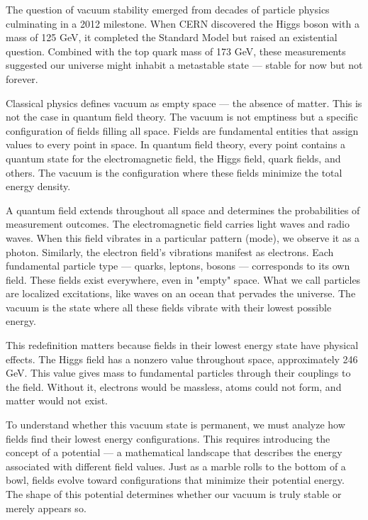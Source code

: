 
The question of vacuum stability emerged from decades of particle physics culminating in a 2012 milestone. When CERN discovered the Higgs boson with a mass of 125 GeV, it completed the Standard Model but raised an existential question. Combined with the top quark mass of 173 GeV, these measurements suggested our universe might inhabit a metastable state — stable for now but not forever.

Classical physics defines vacuum as empty space — the absence of matter. This is not the case in quantum field theory. The vacuum is not emptiness but a specific configuration of fields filling all space. Fields are fundamental entities that assign values to every point in space. In quantum field theory, every point contains a quantum state for the electromagnetic field, the Higgs field, quark fields, and others. The vacuum is the configuration where these fields minimize the total energy density.

A quantum field extends throughout all space and determines the probabilities of measurement outcomes. The electromagnetic field carries light waves and radio waves. When this field vibrates in a particular pattern (mode), we observe it as a photon. Similarly, the electron field's vibrations manifest as electrons. Each fundamental particle type — quarks, leptons, bosons — corresponds to its own field. These fields exist everywhere, even in "empty" space. What we call particles are localized excitations, like waves on an ocean that pervades the universe. The vacuum is the state where all these fields vibrate with their lowest possible energy.

This redefinition matters because fields in their lowest energy state have physical effects. The Higgs field has a nonzero value throughout space, approximately 246 GeV. This value gives mass to fundamental particles through their couplings to the field. Without it, electrons would be massless, atoms could not form, and matter would not exist.

To understand whether this vacuum state is permanent, we must analyze how fields find their lowest energy configurations. This requires introducing the concept of a potential — a mathematical landscape that describes the energy associated with different field values. Just as a marble rolls to the bottom of a bowl, fields evolve toward configurations that minimize their potential energy. The shape of this potential determines whether our vacuum is truly stable or merely appears so.

